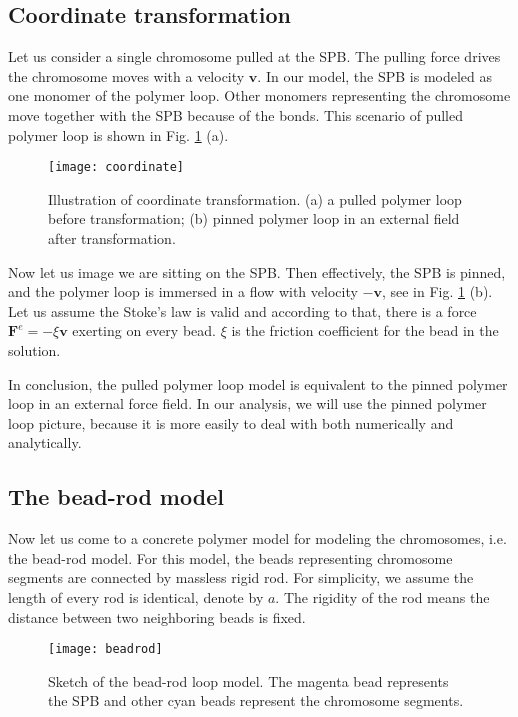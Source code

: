 \subsection{Coordinate transformation}
\label{sub:coordinate_transformation}
Let us consider a single chromosome pulled at the SPB. The pulling force drives the chromosome moves with a velocity $\mathbf{v}$. In our model, the SPB is modeled as one monomer of the polymer loop. Other monomers representing the chromosome move together with the SPB because of the bonds. This scenario of pulled polymer loop is shown in Fig. \ref{fig:coordinate} (a). 
\begin{figure}[htpb]
    \centering
    \texttt{[image: coordinate]}
    \caption{Illustration of coordinate transformation. (a) a pulled polymer loop before transformation; (b) pinned polymer loop in an external field after transformation. }
    \label{fig:coordinate}
\end{figure}

Now let us image we are sitting on the SPB. Then effectively, the SPB is pinned, and the polymer loop is immersed in a flow with velocity $-\mathbf{v}$, see in Fig. \ref{fig:coordinate} (b). Let us assume the Stoke's law is valid and according to that, there is a force $\mathbf{F}^e = - \xi \mathbf{v}$ exerting on every bead. $\xi$ is the friction coefficient for the bead in the solution.

In conclusion, the pulled polymer loop model is equivalent to the pinned polymer loop in an external force field. In our analysis, we will use the pinned polymer loop picture, because it is more easily to deal with both numerically and analytically. 


\subsection{The bead-rod model}
\label{sub:the_bead_rod_model}
Now let us come to a concrete polymer model for modeling the chromosomes, i.e. the bead-rod model. For this model, the beads representing chromosome segments are connected by massless rigid rod. For simplicity, we assume the length of every rod is identical, denote by $a$. The rigidity of the rod means the distance between two neighboring beads is fixed. 
\begin{figure}[htpb]
    \centering
    \texttt{[image: beadrod]}
    \caption{Sketch of the bead-rod loop model. The magenta bead represents the SPB and other cyan beads represent the chromosome segments.}
    \label{fig:beadrod}
\end{figure}

